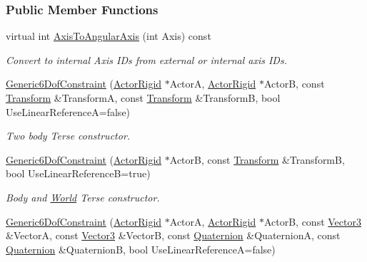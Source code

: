 \subsubsection*{Public Member Functions}
\begin{DoxyCompactItemize}
\item 
virtual int \hyperlink{classMezzanine_1_1Generic6DofConstraint_ad782a17567bfcfb2a0eaf08edb5d6838}{AxisToAngularAxis} (int Axis) const 
\begin{DoxyCompactList}\small\item\em Convert to internal Axis IDs from external or internal axis IDs. \item\end{DoxyCompactList}\item 
\hyperlink{classMezzanine_1_1Generic6DofConstraint_a373679760f1bc180adda8ad51e20cd38}{Generic6DofConstraint} (\hyperlink{classMezzanine_1_1ActorRigid}{ActorRigid} $\ast$ActorA, \hyperlink{classMezzanine_1_1ActorRigid}{ActorRigid} $\ast$ActorB, const \hyperlink{classMezzanine_1_1Transform}{Transform} \&TransformA, const \hyperlink{classMezzanine_1_1Transform}{Transform} \&TransformB, bool UseLinearReferenceA=false)
\begin{DoxyCompactList}\small\item\em Two body Terse constructor. \item\end{DoxyCompactList}\item 
\hyperlink{classMezzanine_1_1Generic6DofConstraint_a7adce568bcf8f289744686ce129bff08}{Generic6DofConstraint} (\hyperlink{classMezzanine_1_1ActorRigid}{ActorRigid} $\ast$ActorB, const \hyperlink{classMezzanine_1_1Transform}{Transform} \&TransformB, bool UseLinearReferenceB=true)
\begin{DoxyCompactList}\small\item\em Body and \hyperlink{classMezzanine_1_1World}{World} Terse constructor. \item\end{DoxyCompactList}\item 
\hyperlink{classMezzanine_1_1Generic6DofConstraint_af81c1ab120f7d2df27f194ee73516a18}{Generic6DofConstraint} (\hyperlink{classMezzanine_1_1ActorRigid}{ActorRigid} $\ast$ActorA, \hyperlink{classMezzanine_1_1ActorRigid}{ActorRigid} $\ast$ActorB, const \hyperlink{classMezzanine_1_1Vector3}{Vector3} \&VectorA, const \hyperlink{classMezzanine_1_1Vector3}{Vector3} \&VectorB, const \hyperlink{classMezzanine_1_1Quaternion}{Quaternion} \&QuaternionA, const \hyperlink{classMezzanine_1_1Quaternion}{Quaternion} \&QuaternionB, bool UseLinearReferenceA=false)

\end{DoxyCompactItemize}
